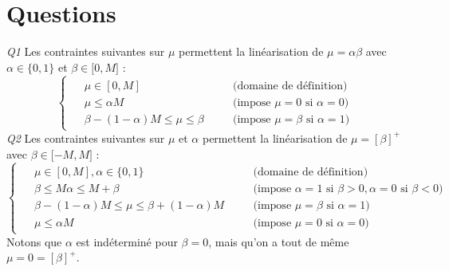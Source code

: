 \documentclass[a4paper,12pt]{article}
\begin{document}
\section{Questions}
    \textit{Q1 }
    Les contraintes suivantes sur $\mu$ permettent la linéarisation de $\mu = \alpha \beta$ avec $\alpha \in \lbrace 0,1 \rbrace$ et $\beta \in \lbrack 0, M \rbrack$ : 
    \begin{equation*}
        \begin{cases}
            \begin{alignedat}{2}
                &\mu \in [0,M] && \quad \text{(domaine de définition)}  \\ 
                &\mu \leq \alpha M && \quad  \text{(impose } \mu = 0 \text{ si }  \alpha = 0 \text{)}\\
                &\beta - (1 - \alpha)M \leq \mu \leq \beta && \quad \text{(impose } \mu = \beta \text{ si }  \alpha = 1 \text{)}
            \end{alignedat}
        \end{cases}
    \end{equation*}
    \textit{Q2 }
    Les contraintes suivantes sur $\mu$ et $\alpha$ permettent la linéarisation de $\mu = [\beta]^{+}$ avec $\beta \in \lbrack -M, M \rbrack$ : 
    \begin{equation*}
        \begin{cases}
            \begin{alignedat}{2}
                &\mu \in [0,M], \alpha \in \lbrace 0,1 \rbrace && \quad \text{(domaine de définition)} \\ 
                &\beta \leq M \alpha \leq M + \beta && \quad \text{(impose } \alpha = 1 \text{ si }  \beta > 0, \alpha = 0 \text{ si } \beta < 0 \text{)} \\
                &\beta - (1-\alpha)M \leq \mu \leq \beta + (1-\alpha)M && \quad \text{(impose } \mu = \beta \text{ si }  \alpha = 1 \text{)} \\
                &\mu \leq \alpha M && \quad \text{(impose } \mu = 0 \text{ si }  \alpha = 0 \text{)}
            \end{alignedat}
        \end{cases}
    \end{equation*}
    Notons que $\alpha$ est indéterminé pour $\beta = 0$, mais qu'on a tout de même $\mu = 0= [\beta]^{+}$. \\
\end{document}

